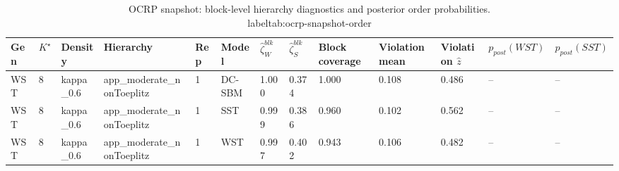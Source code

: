 \begin{table}[!h]
\centering
\caption{OCRP snapshot: block-level hierarchy diagnostics and posterior order probabilities.\\label{tab:ocrp-snapshot-order}}
\centering
\begin{tabular}[t]{lllllllllllll}
\toprule
Gen & $K^\star$ & Density & Hierarchy & Rep & Model & $\widehat\zeta_W^{blk}$ & $\widehat\zeta_S^{blk}$ & Block coverage & Violation mean & Violation $\hat z$ & $p_{post}(WST)$ & $p_{post}(SST)$\\
\midrule
WST & 8 & kappa_0.6 & app_moderate_nonToeplitz & 1 & DC-SBM & 1.000 & 0.374 & 1.000 & 0.108 & 0.486 & -- & --\\
WST & 8 & kappa_0.6 & app_moderate_nonToeplitz & 1 & SST & 0.999 & 0.386 & 0.960 & 0.102 & 0.562 & -- & --\\
WST & 8 & kappa_0.6 & app_moderate_nonToeplitz & 1 & WST & 0.997 & 0.402 & 0.943 & 0.106 & 0.482 & -- & --\\
\bottomrule
\end{tabular}
\end{table}
